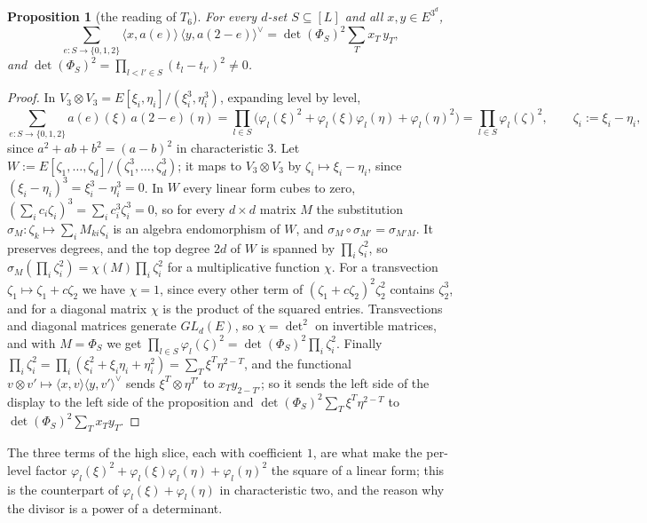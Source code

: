 \documentclass[11pt]{article}
\newtheorem{proposition}[theorem]{Proposition}
\theoremstyle{definition}
\theoremstyle{remark}
\newcommand{\pairL}[2]{\langle #1,#2\rangle}
\newcommand{\pairR}[2]{\langle #1,#2\rangle^{\vee}}
\begin{document}
\begin{proposition}[the reading of $T_6$]\label{prop:B6}
For every $d$-set $S\subseteq[L]$ and all $x,y\in E^{3^d}$,
\[
\sum_{e:S\to\{0,1,2\}}\pairL x{a(e)}\,\pairR y{a(2-e)}=\det(\Phi_S)^2\sum_{T}x_T\,y_T,
\]
and $\det(\Phi_S)^2=\prod_{l<l'\in S}(t_l-t_{l'})^2\ne0$.
\end{proposition}

\begin{proof}
In $V_3\otimes V_3=E[\xi_i,\eta_i]/(\xi_i^3,\eta_i^3)$, expanding level by level,
\[
\sum_{e:S\to\{0,1,2\}}a(e)(\xi)\,a(2-e)(\eta)=\prod_{l\in S}\bigl(\varphi_l(\xi)^2+\varphi_l(\xi)\varphi_l(\eta)+\varphi_l(\eta)^2\bigr)=\prod_{l\in S}\varphi_l(\zeta)^2,\qquad\zeta_i:=\xi_i-\eta_i,
\]
since $a^2+ab+b^2=(a-b)^2$ in characteristic $3$. Let $W:=E[\zeta_1,\dots,\zeta_d]/(\zeta_1^3,\dots,\zeta_d^3)$; it maps to $V_3\otimes V_3$ by $\zeta_i\mapsto\xi_i-\eta_i$, since $(\xi_i-\eta_i)^3=\xi_i^3-\eta_i^3=0$. In $W$ every linear form cubes to zero, $(\sum_ic_i\zeta_i)^3=\sum_ic_i^3\zeta_i^3=0$, so for every $d\times d$ matrix $M$ the substitution $\sigma_M:\zeta_k\mapsto\sum_iM_{ki}\zeta_i$ is an algebra endomorphism of $W$, and $\sigma_M\circ\sigma_{M'}=\sigma_{M'M}$. It preserves degrees, and the top degree $2d$ of $W$ is spanned by $\prod_i\zeta_i^2$, so $\sigma_M(\prod_i\zeta_i^2)=\chi(M)\prod_i\zeta_i^2$ for a multiplicative function $\chi$. For a transvection $\zeta_1\mapsto\zeta_1+c\zeta_2$ we have $\chi=1$, since every other term of $(\zeta_1+c\zeta_2)^2\zeta_2^2$ contains $\zeta_2^3$, and for a diagonal matrix $\chi$ is the product of the squared entries. Transvections and diagonal matrices generate $GL_d(E)$, so $\chi=\det^2$ on invertible matrices, and with $M=\Phi_S$ we get $\prod_{l\in S}\varphi_l(\zeta)^2=\det(\Phi_S)^2\prod_i\zeta_i^2$. Finally $\prod_i\zeta_i^2=\prod_i(\xi_i^2+\xi_i\eta_i+\eta_i^2)=\sum_T\xi^T\eta^{2-T}$, and the functional $v\otimes v'\mapsto\pairL xv\pairR y{v'}$ sends $\xi^T\otimes\eta^{T'}$ to $x_Ty_{2-T'}$; so it sends the left side of the display to the left side of the proposition and $\det(\Phi_S)^2\sum_T\xi^T\eta^{2-T}$ to $\det(\Phi_S)^2\sum_Tx_Ty_T$.
\end{proof}

The three terms of the high slice, each with coefficient $1$, are what make the per-level factor $\varphi_l(\xi)^2+\varphi_l(\xi)\varphi_l(\eta)+\varphi_l(\eta)^2$ the square of a linear form; this is the counterpart of $\varphi_l(\xi)+\varphi_l(\eta)$ in characteristic two, and the reason why the divisor is a power of a determinant.
\end{document}
